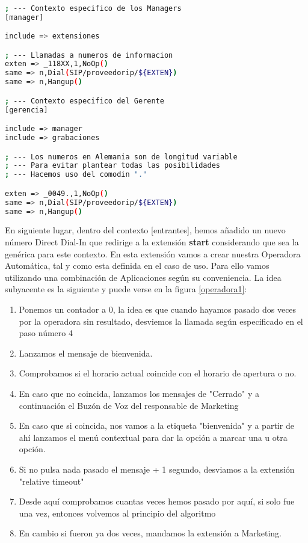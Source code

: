 \begin{lstlisting}[language=bash,title={/etc/asterisk/extensions.conf}]

; --- Contexto especifico de los Managers
[manager]

include => extensiones

; --- Llamadas a numeros de informacion
exten => _118XX,1,NoOp()
same => n,Dial(SIP/proveedorip/${EXTEN})
same => n,Hangup()

; --- Contexto especifico del Gerente
[gerencia]

include => manager
include => grabaciones

; --- Los numeros en Alemania son de longitud variable
; --- Para evitar plantear todas las posibilidades
; --- Hacemos uso del comodin "."

exten => _0049.,1,NoOp()
same => n,Dial(SIP/proveedorip/${EXTEN})
same => n,Hangup()

\end{lstlisting}

En siguiente lugar, dentro del contexto [entrantes], hemos añadido un nuevo número Direct Dial-In que redirige a la extensión \textbf{start} considerando que sea la genérica para este contexto. En esta extensión vamos a crear nuestra Operadora Automática, tal y como esta definida en el caso de uso. Para ello vamos utilizando una combinación de Aplicaciones según su conveniencia. La idea subyacente es la siguiente y puede verse en la figura \ref{operadora1}:

\begin{enumerate}

\item Ponemos un contador a 0, la idea es que cuando hayamos pasado dos veces por la operadora sin resultado, desviemos la llamada según especificado en el paso número 4
\item Lanzamos el mensaje de bienvenida.
\item Comprobamos si el horario actual coincide con el horario de apertura o no. 
\item En caso que no coincida, lanzamos los mensajes de "Cerrado" y a continuación el Buzón de Voz del responsable de Marketing
\item En caso que si coincida, nos vamos a la etiqueta "bienvenida" y a partir de ahí lanzamos el menú contextual para dar la opción a marcar una u otra opción. 
\item Si no pulsa nada pasado el mensaje + 1 segundo, desviamos a la extensión "relative timeout" 
\item Desde aquí comprobamos cuantas veces hemos pasado por aquí, si solo fue una vez, entonces volvemos al principio del algoritmo
\item En cambio si fueron ya dos veces, mandamos la extensión a Marketing.

\end{enumerate}

